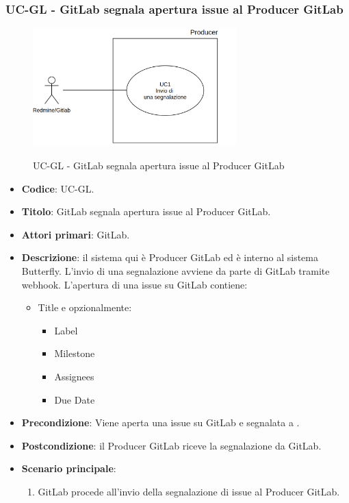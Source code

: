 \subsubsection{UC\theuccount-GL - GitLab segnala apertura issue al Producer GitLab}
	\begin{figure}[H]
		\centering
		\includegraphics[width=0.7\textwidth]{img/UC1.png}\\
		\caption{UC\theuccount-GL - GitLab segnala apertura issue al Producer GitLab}
	\end{figure}
	\begin{itemize}
		\item \textbf{Codice}: UC\theuccount-GL.
		\item \textbf{Titolo}: GitLab segnala apertura issue al Producer GitLab.
		\item \textbf{Attori primari}: GitLab.
		\item \textbf{Descrizione}: il sistema qui è Producer GitLab ed è interno al sistema Butterfly. L'invio di
		una segnalazione avviene da parte di GitLab tramite webhook. L'apertura di
		una issue su GitLab contiene:
		\begin{itemize}
			\item Title e opzionalmente:
			\begin{itemize}
				\item Label
				\item Milestone
				\item Assignees
				\item Due Date
			\end{itemize}
		\end{itemize}
		\item \textbf{Precondizione}: Viene aperta una issue su GitLab e 
		segnalata a \progetto.
		\item \textbf{Postcondizione}: il Producer GitLab riceve la segnalazione da GitLab.
		\item \textbf{Scenario principale}: 
		\begin{enumerate}
			\item GitLab procede all'invio della segnalazione di issue al Producer GitLab.
		\end{enumerate}
		
	\end{itemize}